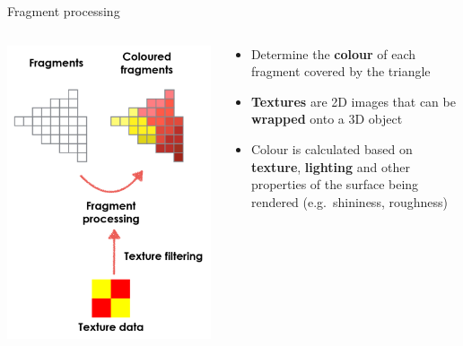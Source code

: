 \begin{frame}{Fragment processing}
\begin{columns}
\begin{column}{0.3\textwidth}
\includegraphics[width=\textwidth]{pipeline_3}
\end{column}
\begin{column}{0.65\textwidth}
\begin{itemize}
\pause\item Determine the \textbf{colour} of each fragment covered by the triangle
\pause\item \textbf{Textures} are 2D images that can be \textbf{wrapped} onto a 3D object
\pause\item Colour is calculated based on \textbf{texture}, \textbf{lighting} and other
properties of the surface being rendered (e.g.\ shininess, roughness)
\end{itemize}
\end{column}
\end{columns}
\end{frame}

